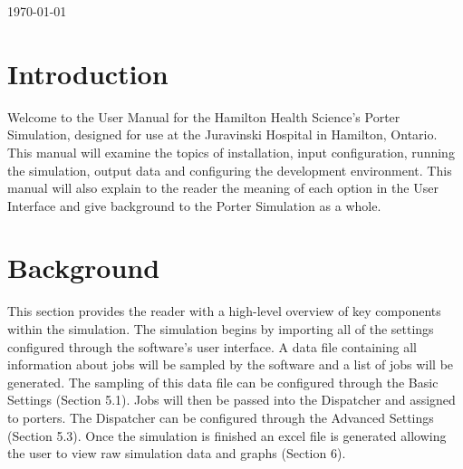 \documentclass[paper=letter, fontsize=10pt]{scrartcl}
\numberwithin{equation}{section}		%
\numberwithin{figure}{section}			%
\numberwithin{table}{section}				%
\begin{document}
\begin{titlepage}
\begin{center}


{\large \today}\\[3cm] %


 

\vfill %
\end{center}
\end{titlepage}

\setcounter{tocdepth}{2}

\tableofcontents

\newpage
\section{Introduction}
Welcome to the User Manual for the Hamilton Health Science's Porter Simulation, designed for use at the Juravinski Hospital in Hamilton, Ontario. This manual will examine the topics of installation, input configuration, running the simulation, output data and configuring the development environment.  This manual will also explain to the reader the meaning of each option in the User Interface and give background to the Porter Simulation as a whole.

\section{Background}
This section provides the reader with a high-level overview of key components within the simulation.  The simulation begins by importing all of the settings configured through the software's user interface.  A data file containing all information about jobs will be sampled by the software and a list of jobs will be generated.  The sampling of this data file can be configured through the Basic Settings (Section 5.1).  Jobs will then be passed into the Dispatcher and assigned to porters.  The Dispatcher can be configured through the Advanced Settings (Section 5.3).  Once the simulation is finished an excel file is generated allowing the user to view raw simulation data and graphs (Section 6).
	
\end{document}
